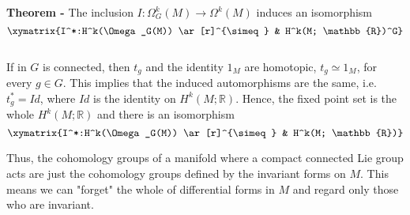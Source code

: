 \documentclass[12pt]{article}
\begin{document}
{\bf Theorem -} The inclusion $I:\Omega_G^k(M) \longrightarrow \Omega^k(M)$ induces an isomorphism
\begin{displaymath}
\xymatrix{I^*:H^k(\Omega_G(M)) \ar[r]^{\simeq} & H^k(M; \mathbb{R})^G}
\end{displaymath}

$\,$

If in  $G$ is connected, then $t_g$ and the identity $1_M$ are homotopic, $t_g \simeq 1_M$, for every $g \in G$. This implies that the induced automorphisms are the same, i.e. $t_g^* = Id$, where $Id$ is the identity on $H^k(M; \mathbb{R})$. Hence, the fixed point set is the whole $H^k(M;\mathbb{R})$ and there is an isomorphism
\begin{displaymath}
\xymatrix{I^*:H^k(\Omega_G(M)) \ar[r]^{\simeq} & H^k(M; \mathbb{R})}
\end{displaymath}

Thus, the cohomology groups of a manifold where a compact connected Lie group acts are just the cohomology groups defined by the invariant forms on $M$. This means we can "forget" the whole  of differential forms in $M$ and regard only those who are invariant.
\end{document}
